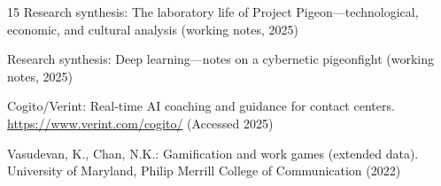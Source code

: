 \documentclass[runningheads]{llncs}
\begin{document}
\begin{thebibliography}{15}
Research synthesis: The laboratory life of Project Pigeon---technological,
economic, and cultural analysis (working notes, 2025)

Research synthesis: Deep learning---notes on a cybernetic pigeonfight
(working notes, 2025)

Cogito/Verint: Real-time AI coaching and guidance for contact centers.
\url{https://www.verint.com/cogito/} (Accessed 2025)

Vasudevan, K., Chan, N.K.: Gamification and work games (extended data).
University of Maryland, Philip Merrill College of Communication (2022)

\end{thebibliography}
\end{document}
